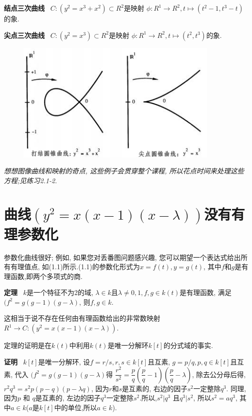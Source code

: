 \documentclass[UTF8]{book}
\begin{document}
	
		\textbf{结点三次曲线} \ $C:(y^{2}=x^{3}+x^{2})\subset R^{2}$是映射 $\phi:R^{1}\rightarrow R^{2} , t\longmapsto(t^{2}-1,t^{3}-t) $的象.
		
		\textbf{尖点三次曲线} \ $C:(y^{2}=x^{3})\subset R^{2}$是映射 $\phi:R^{1}\rightarrow R^{2} , t\longmapsto(t^{2},t^{3}) $的象.
		
		\begin{figure}[h]
		  \centering
		  \includegraphics[width=10cm]{27.jpg} \\
		\end{figure}
		
		\textit{想想图像曲线和映射的奇点, 这些例子会贯穿整个课程, 所以花点时间来处理这些方程;见\textit{练习2.1-2}.}

	\section{曲线$(y^{2}=x(x-1)(x-\lambda))$没有有理参数化}
		参数化曲线很好; 例如, 如果您对丢番图问题感兴趣, 您可以期望一个表达式给出所有有理值点, 如(1.1)所示.(1.1)的参数化形式为$ x = f(t), y = g(t) $, 其中$ f $和$ g $是有理函数,即两个多项式的商.
		
		\textbf{定理} \ $ k $是一个特征不为2的域, $\lambda\in k$且$\lambda\neq0,1,f,g\in k(t)$是有理函数, 满足$(f^{2}=g(g-1)(g-\lambda)$, 则$f,g\in k$.
		
		
		这相当于说不存在任何由有理函数给出的非常数映射$R^{1}\rightarrow C: (y^{2}=x(x-1)(x-\lambda))$.
		
		
		定理的证明是在$ k(t) $中利用$ k(t) $是唯一分解环$ k[t] $的分式域的事实.
		
		
		\textbf{证明} \ $ k[t] $是唯一分解环, 设$f=r/s,  r,s\in k[t]$且互素, $g=p/q,  p,q\in k[t]$且互素, 代入 $(f^{2}=g(g-1)(g-\lambda)$得
		$\dfrac{r^{2}}{s^{2}}=\dfrac{p}{q}(\dfrac{p}{q}-1)(\dfrac{p}{q}-\lambda)$, 除去公分母后得, $r^{2}q^{3}=s^{2}p(p-q)(p-\lambda q)$, 因为$ r $和$ s $是互素的, 右边的因子$s^{2}$一定整除$q^{3}$. 同理,因为$ p$ 和 $q $是互素的, 左边的因子$q^{3}$一定整除$s^{2}$.所以,$s^{2}|q^{3}$ 且$q^{3}|s^{2}$, 所以$s^{2}=aq^{3}$, 其中$a\in k$($ a $是$ k[t] $中的单位,所以$a\in k$).
		
\end{document}
